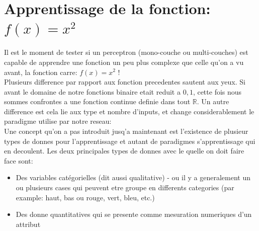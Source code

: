 \documentclass[twoside,openright,a4paper,11pt,french]{article}
\begin{document}

\section{Apprentissage de la fonction: $f(x) = x^2$}

Il est le moment de tester si un perceptron (mono-couche ou multi-couches) est
capable de apprendre une fonction un peu plus complexe que celle qu'on a vu avant, 
la fonction carre: $f(x) = x^2$ !\\

Plusieurs difference par rapport aux fonction precedentes sautent aux yeux.
Si avant le domaine de notre fonctions binaire etait reduit a ${0,1}$, cette
fois nous sommes confrontes a une fonction continue definie dans tout $\mathbb{R}$.
Un autre difference est cela lie aux type et nombre d'inputs, et change
considerablement le paradigme utilise par notre reseau:\\

Une concept qu'on a pas introduit jusq'a maintenant est l'existence de plusieur
types de donnes pour l'apprentissage et autant de paradigmes s'apprentissage qui en
decoulent. Les deux principales types de donnes avec le quelle on doit faire
face sont:

\begin{itemize}
\item Des variables catégorielles (dit aussi qualitative) - ou il y a generalement
      un ou plusieurs cases qui peuvent etre groupe en differents categories 
     (par example: haut, bas ou rouge, vert, bleu, etc.)
\item Des donne quantitatives qui se presente comme mesuration numeriques d'un attribut
\end{itemize}
\end{document}
